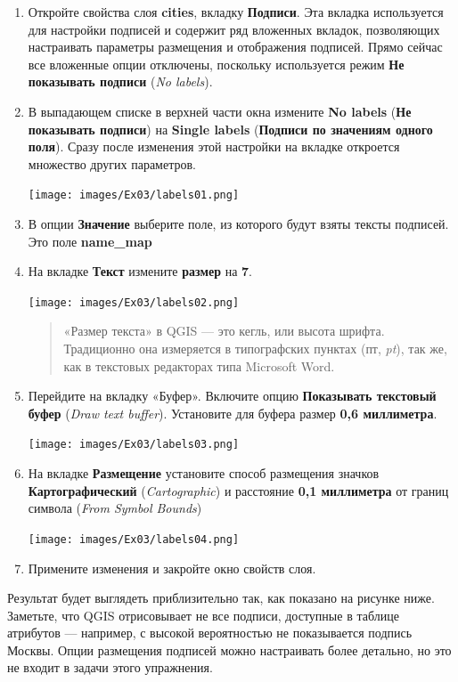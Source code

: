 \documentclass[
  12pt,
]{book}
\begin{document}
\begin{enumerate}
\def\labelenumi{\arabic{enumi}.}
\item
  Откройте свойства слоя \textbf{cities}, вкладку \textbf{Подписи}. Эта вкладка используется для настройки подписей и содержит ряд вложенных вкладок, позволяющих настраивать параметры размещения и отображения подписей. Прямо сейчас все вложенные опции отключены, поскольку используется режим \textbf{Не показывать подписи} (\emph{No labels}).
\item
  В выпадающем списке в верхней части окна измените \textbf{No labels} (\textbf{Не показывать подписи}) на \textbf{Single labels} (\textbf{Подписи по значениям одного поля}). Сразу после изменения этой настройки на вкладке откроется множество других параметров.

  \texttt{[image: images/Ex03/labels01.png]}
\item
  В опции \textbf{Значение} выберите поле, из которого будут взяты тексты подписей. Это поле \textbf{name\_map}
\item
  На вкладке \textbf{Текст} измените \textbf{размер} на \textbf{7}.

  \texttt{[image: images/Ex03/labels02.png]}

  \begin{quote}
  «Размер текста» в QGIS --- это кегль, или высота шрифта. Традиционно она измеряется в типографских пунктах (пт, \emph{pt}), так же, как в текстовых редакторах типа Microsoft Word.
  \end{quote}
\item
  Перейдите на вкладку «Буфер». Включите опцию \textbf{Показывать текстовый буфер} (\emph{Draw text buffer}). Установите для буфера размер \textbf{0,6 миллиметра}.

  \texttt{[image: images/Ex03/labels03.png]}
\item
  На вкладке \textbf{Размещение} установите способ размещения значков \textbf{Картографический} (\emph{Cartographic}) и расстояние \textbf{0,1 миллиметра} от границ символа (\emph{From Symbol Bounds})

  \texttt{[image: images/Ex03/labels04.png]}
\item
  Примените изменения и закройте окно свойств слоя.
\end{enumerate}

Результат будет выглядеть приблизительно так, как показано на рисунке ниже. Заметьте, что QGIS отрисовывает не все подписи, доступные в таблице атрибутов --- например, с высокой вероятностью не показывается подпись Москвы. Опции размещения подписей можно настраивать более детально, но это не входит в задачи этого упражнения.
\end{document}
